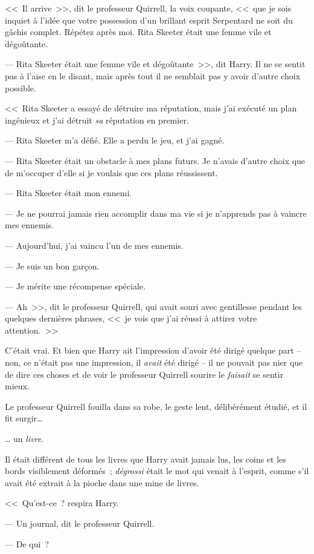 <<~Il arrive~>>, dit le professeur Quirrell, la voix coupante, <<~que je sois inquiet à l'idée que votre possession d'un brillant esprit Serpentard ne soit du gâchis complet. Répétez après moi. Rita Skeeter était une femme vile et dégoûtante.

--- Rita Skeeter était une femme vile et dégoûtante~>>, dit Harry. Il ne se sentit pas à l'aise en le disant, mais après tout il ne semblait pas y avoir d'autre choix possible.

<<~Rita Skeeter a essayé de détruire ma réputation, mais j'ai exécuté un plan ingénieux et j'ai détruit \emph{sa} réputation en premier.

--- Rita Skeeter m'a défié. Elle a perdu le jeu, et j'ai gagné.

--- Rita Skeeter était un obstacle à mes plans futurs. Je n'avais d'autre choix que de m'occuper d'elle si je voulais que ces plans réussissent.

--- Rita Skeeter était mon ennemi.

--- Je ne pourrai jamais rien accomplir dans ma vie si je n'apprends pas à vaincre mes ennemis.

--- Aujourd'hui, j'ai vaincu l'un de mes ennemis.

--- Je suis un bon garçon.

--- Je mérite une récompense spéciale.

--- Ah~>>, dit le professeur Quirrell, qui avait souri avec gentillesse pendant les quelques dernières phrases, <<~je vois que j'ai réussi à attirer votre attention.~>>

C'était vrai. Et bien que Harry ait l'impression d'avoir été dirigé quelque part -- non, ce n'était pas une impression, il \emph{avait} été dirigé -- il ne pouvait pas nier que de dire ces choses et de voir le professeur Quirrell sourire le \emph{faisait} se sentir mieux.

Le professeur Quirrell fouilla dans sa robe, le geste lent, délibérément étudié, et il fit surgir…

… un \emph{livre}.

Il était différent de tous les livres que Harry avait jamais lus, les coins et les bords visiblement déformés~; \emph{dégrossi} était le mot qui venait à l'esprit, comme s'il avait été extrait à la pioche dans une mine de livres.

<<~Qu'est-ce~? respira Harry.

--- Un journal, dit le professeur Quirrell.

--- De qui~?


